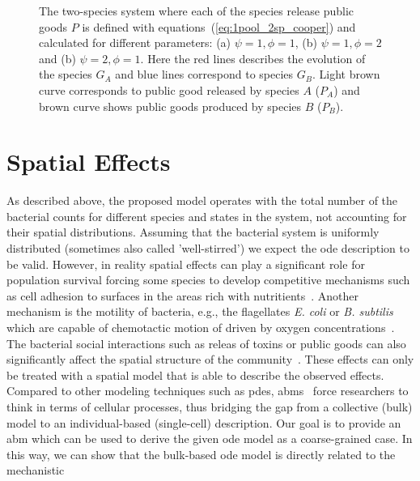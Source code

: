\documentclass[10pt,A4paper]{article}
\numberwithin{equation}{section}
\begin{document}
\begin{figure}
\begin{center}
    \caption{
        The two-species system where each of the species release public goods $P$ is defined with equations~(\ref{eq:1pool_2sp_cooper}) and calculated for different parameters:
        (a) $\psi=1, \phi=1$, (b) $\psi=1, \phi=2$ and (b) $\psi=2, \phi=1$.
        Here the red lines describes the evolution of the species $G_A$ and blue lines correspond to species $G_B$.
        Light brown curve corresponds to public good released by species $A$ ($P_A$) and brown curve shows public goods produced by species $B$ ($P_B$).
    }
    \label{fig:1pool_2sp_cooper}
    \end{center}
\end{figure}

\section{Spatial Effects}
As described above, the proposed model operates with the total number of the bacterial counts for
different species and states in the system, not accounting for their spatial distributions.
Assuming that the bacterial system is uniformly distributed (sometimes also called 'well-stirred')
we expect the \ac{ode} description to be valid.
However, in reality spatial effects can play a significant role for population survival forcing some
species to develop competitive mechanisms such as cell adhesion to surfaces in the areas rich with
nutritients~\cite{htuson_bacteriasurface_2013}.
Another mechanism is the motility of bacteria, e.g., the flagellates \textit{E. coli} or
\textit{B. subtilis} which are capable of chemotactic motion of driven by oxygen
concentrations~\cite{decoene_microscopic_2011}.
The bacterial social interactions such as releas of toxins or public goods can also
significantly affect the spatial structure of the community~\cite{blanchard_bacterial_2015}.
These effects can only be treated with a spatial model that is able to describe the observed
effects.\\
Compared to other modeling techniques such as \acp{pde}, \acp{abm}~\cite{nagarajan_agent-based_2022-1} force researchers to think in
terms of cellular processes, thus bridging the gap from a
collective (bulk) model to an individual-based (single-cell) description.
Our goal is to provide an \ac{abm} which can be used to derive the given \ac{ode} model as a
coarse-grained case.
In this way, we can show that the bulk-based \ac{ode} model is directly related to the mechanistic
\end{document}
